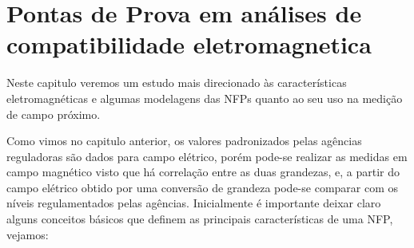 \chapter{Pontas de Prova em análises de compatibilidade eletromagnetica}
Neste capitulo veremos um estudo mais direcionado às características eletromagnéticas e algumas modelagens das NFPs quanto ao seu uso na medição de campo próximo.

Como vimos no capitulo anterior, os valores padronizados pelas agências reguladoras são dados para campo elétrico, porém pode-se realizar as medidas em campo magnético visto que há correlação entre as duas grandezas, e, a partir do campo elétrico obtido por uma conversão de grandeza pode-se comparar com os níveis regulamentados pelas agências. Inicialmente é importante deixar claro alguns conceitos básicos que definem as principais características de uma NFP, vejamos:
